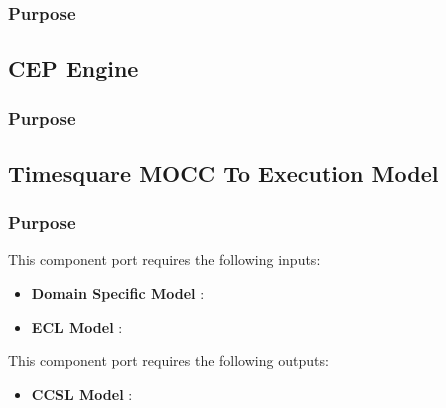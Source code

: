 \documentclass{gemoc} %
\begin{document}

\subsubsection{Purpose}



\subsection{CEP Engine}


\subsubsection{Purpose}



\subsection{Timesquare MOCC To Execution Model}


\subsubsection{Purpose}

This component port requires the following inputs:
\begin{itemize}
  \item \textbf{Domain Specific Model} :
  \item \textbf{ECL Model} :
\end{itemize}

This component port requires the following outputs:
\begin{itemize}
  \item \textbf{CCSL Model} :
\end{itemize}
\end{document}
